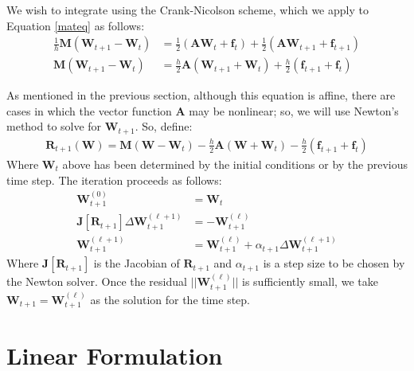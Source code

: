 \documentclass{article}
\newcommand{\bvec}[1]{\boldsymbol{#1}}
\newcommand{\bmat}[1]{\boldsymbol{#1}}
\newcommand{\brmat}[1]{\mathbf{#1}}
\begin{document}
We wish to integrate using the Crank-Nicolson scheme,
which we apply to Equation \ref{mateq} as follows:
\begin{align*}
    \frac{1}{h} \bmat{M} (\bvec{W}_{t + 1} - \bvec{W}_t)
        & = \frac{1}{2} (\bmat{A} \bvec{W}_t + \bvec{f}_t)
            + \frac{1}{2} (\bmat{A} \bvec{W}_{t + 1} + \bvec{f}_{t + 1}) \\
    \bmat{M} (\bvec{W}_{t + 1} - \bvec{W}_t)
        & = \frac{h}{2} \bmat{A} (\bvec{W}_{t + 1} + \bvec{W}_t)
            + \frac{h}{2} (\bvec{f}_{t + 1} + \bvec{f}_t)
\end{align*}

As mentioned in the previous section, although this equation is affine,
there are cases in which the vector function $\bmat{A}$ may be nonlinear;
so, we will use Newton's method to solve for $\bvec{W}_{t + 1}$. So, define:
\begin{align*}
    \bvec{R}_{t + 1}(\bvec{W})
        = \bmat{M}(\bvec{W} - \bvec{W}_t)
            - \frac{h}{2} \bmat{A} (\bvec{W} + \bvec{W}_t)
            - \frac{h}{2} (\bvec{f}_{t + 1} + \bvec{f}_t)
\end{align*}
\noindent Where $\bvec{W}_t$ above has been determined by the initial conditions
or by the previous time step. The iteration proceeds as follows:
\begin{align*}
    \bvec{W}_{t + 1}^{(0)} & = \bvec{W}_t \\
    \brmat{J}[\bvec{R}_{t + 1}] \Delta \bvec{W}_{t + 1}^{(\ell + 1)} & = - \bvec{W}_{t + 1}^{(\ell)} \\
    \bvec{W}_{t + 1}^{(\ell + 1)} & = \bvec{W}_{t + 1}^{(\ell)} + \alpha_{t + 1} \Delta \bvec{W}_{t + 1}^{(\ell + 1)}
\end{align*}
\noindent Where $\brmat{J}[\bvec{R}_{t + 1}]$ is the Jacobian of $\bvec{R}_{t + 1}$
and $\alpha_{t + 1}$ is a step size to be chosen by the Newton solver.
Once the residual $||\bvec{W}_{t + 1}^{(\ell)}||$ is sufficiently small,
we take $\bvec{W}_{t + 1} = \bvec{W}_{t + 1}^{(\ell)}$ as the solution for the time step.

\newpage

\section{Linear Formulation}
\end{document}
